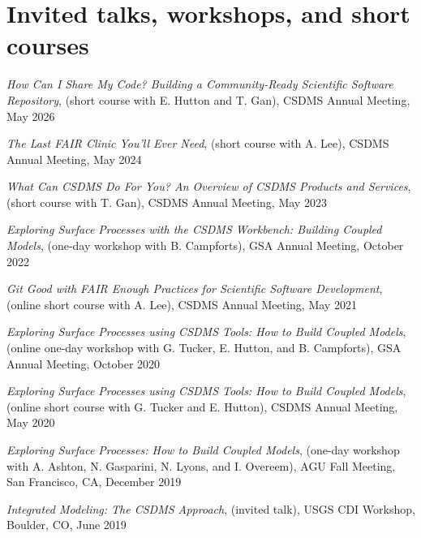 \section{Invited talks, workshops, and short courses}
\vspace{0.5em}

\begin{enumerate}[{[}1{]}]

  \item \textit{How Can I Share My Code? Building a Community-Ready
    Scientific Software Repository}, (short course with E. Hutton and T. Gan),
    CSDMS Annual Meeting, May 2026

  \item \textit{The Last FAIR Clinic You'll Ever Need}, (short course with A.
    Lee), CSDMS Annual Meeting, May 2024

  \item \textit{What Can CSDMS Do For You? An Overview of CSDMS Products and
    Services}, (short course with T. Gan), CSDMS Annual Meeting, May 2023

  \item \textit{Exploring Surface Processes with the CSDMS Workbench: Building
    Coupled Models}, (one-day workshop with B. Campforts), GSA Annual Meeting,
    October 2022

  \item \textit{Git Good with FAIR Enough Practices for Scientific
    Software Development}, (online short course with A. Lee), CSDMS
    Annual Meeting, May 2021

  \item \textit{Exploring Surface Processes using CSDMS Tools: How to Build
    Coupled Models}, (online one-day workshop with G. Tucker, E. Hutton, and B.
    Campforts), GSA Annual Meeting, October 2020

  \item \textit{Exploring Surface Processes using CSDMS Tools: How to
    Build Coupled Models}, (online short course with G. Tucker and
    E. Hutton), CSDMS Annual Meeting, May 2020

  \item \textit{Exploring Surface Processes: How to Build Coupled Models},
    (one-day workshop with A. Ashton, N. Gasparini, N. Lyons, and I. Overeem),
    AGU Fall Meeting, San Francisco, CA, December 2019

  \item \textit{Integrated Modeling: The CSDMS Approach}, (invited
    talk), USGS CDI Workshop, Boulder, CO, June 2019


\end{enumerate}
